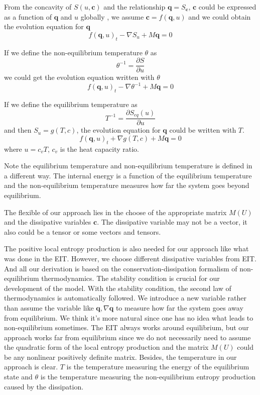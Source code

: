 \documentclass[a4paper]{article}
\begin{document}
From the concavity of $S(u,\mathbf{c})$ and the relationship $\mathbf{q}=S_\mathbf{c}$, $\mathbf{c}$ could be expressed as a function of $\mathbf{q}$ and $u$ globally \cite{friedrichs1971systems}, we assume $\mathbf{c}=f(\mathbf{q},u)$ and we could obtain the evolution equation for $\mathbf{q}$
\begin{equation}
f(\mathbf{q},u)_t-\nabla S_u + M \mathbf{q} = 0
\end{equation}

If we define the non-equilibrium temperature $\theta$ as
\begin{equation}
\theta^{-1}=\frac{\partial S}{\partial u}
\end{equation}
we could get the evolution equation written with $\theta$
\begin{equation}
f(\mathbf{q},u)_t-\nabla \theta^{-1} + M \mathbf{q} = 0
\end{equation}

If we define the equilibrium temperature as
\begin{equation}
T^{-1} = \frac{\partial S_{eq}(u)}{\partial u}
\end{equation}
and then $S_u = g(T,c)$, the evolution equation for $\mathbf{q}$ could be written with $T$.
\begin{equation}
f(\mathbf{q},u)_t + \nabla g(T,c) + M \mathbf{q} = 0
\end{equation}
where $u=c_v T$, $c_v$ is the heat capacity ratio.

Note the equilibrium temperature and non-equilibrium temperature is defined in a different way. The internal energy is a function of the equilibrium temperature and the non-equilibrium temperature measures how far the system goes beyond equilibrium.

The flexible of our approach lies in the choose of the appropriate matrix $M(U)$ and the dissipative variables $\mathbf{c}$. The dissipative variable may not be a vector, it also could be a tensor or some vectors and tensors. 

The positive local entropy production is also needed for our approach like what was done in the EIT. However, we choose different dissipative variables from EIT. And all our derivation is based on the conservation-dissipation formalism of non-equilibrium thermodynamics. The stability condition is crucial for our development of the model. With the stability condition, the second law of thermodynamics is automatically followed. We introduce a new variable rather than assume the variable like $\mathbf{q},\nabla \mathbf{q}$ to measure how far the system goes away from equilibrium. We think it's more natural  since one has no idea what leads to non-equilibrium sometimes. The EIT always works around equilibrium, but our approach works far from equilibrium since we do not necessarily need to assume the   quadratic form of the local entropy production and the matrix $M(U)$ could be any nonlinear positively definite matrix. Besides, the temperature in our approach is clear. $T$ is the temperature measuring the energy of the equilibrium state and $\theta$ is the temperature measuring the non-equilibrium entropy production caused by the dissipation.  
\end{document}
